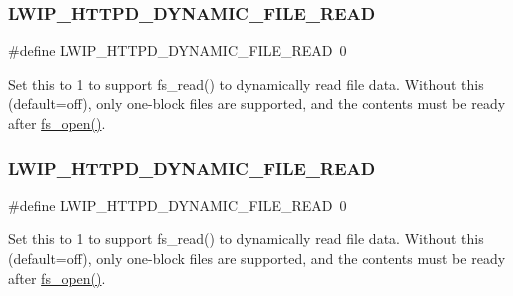 \subsubsection{\texorpdfstring{L\+W\+I\+P\+\_\+\+H\+T\+T\+P\+D\+\_\+\+D\+Y\+N\+A\+M\+I\+C\+\_\+\+F\+I\+L\+E\+\_\+\+R\+E\+AD}{LWIP\_HTTPD\_DYNAMIC\_FILE\_READ}\hspace{0.1cm}{\footnotesize\ttfamily [1/2]}}
{\footnotesize\ttfamily \#define L\+W\+I\+P\+\_\+\+H\+T\+T\+P\+D\+\_\+\+D\+Y\+N\+A\+M\+I\+C\+\_\+\+F\+I\+L\+E\+\_\+\+R\+E\+AD~0}

Set this to 1 to support fs\+\_\+read() to dynamically read file data. Without this (default=off), only one-\/block files are supported, and the contents must be ready after \hyperlink{native_2lwip_2src_2apps_2httpd_2fs_8c_a594058d3f4dd9f333c51b7e5ca910ac3}{fs\+\_\+open()}. \mbox{\label{group__httpd__opts_ga1ee8d7c975c7e3d1c9d9dd9b43660c79}} 
\subsubsection{\texorpdfstring{L\+W\+I\+P\+\_\+\+H\+T\+T\+P\+D\+\_\+\+D\+Y\+N\+A\+M\+I\+C\+\_\+\+F\+I\+L\+E\+\_\+\+R\+E\+AD}{LWIP\_HTTPD\_DYNAMIC\_FILE\_READ}\hspace{0.1cm}{\footnotesize\ttfamily [2/2]}}
{\footnotesize\ttfamily \#define L\+W\+I\+P\+\_\+\+H\+T\+T\+P\+D\+\_\+\+D\+Y\+N\+A\+M\+I\+C\+\_\+\+F\+I\+L\+E\+\_\+\+R\+E\+AD~0}

Set this to 1 to support fs\+\_\+read() to dynamically read file data. Without this (default=off), only one-\/block files are supported, and the contents must be ready after \hyperlink{native_2lwip_2src_2apps_2httpd_2fs_8c_a594058d3f4dd9f333c51b7e5ca910ac3}{fs\+\_\+open()}. \mbox{\label{group__httpd__opts_ga75932fc5eeb9abeddfdaf8413574c6d7}} 
